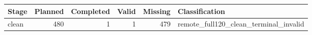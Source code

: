 \begin{tabular}{lrrrrl}
Stage & Planned & Completed & Valid & Missing & Classification \\
\hline
clean & 480 & 1 & 1 & 479 & remote\_full120\_clean\_terminal\_invalid \\
\end{tabular}

